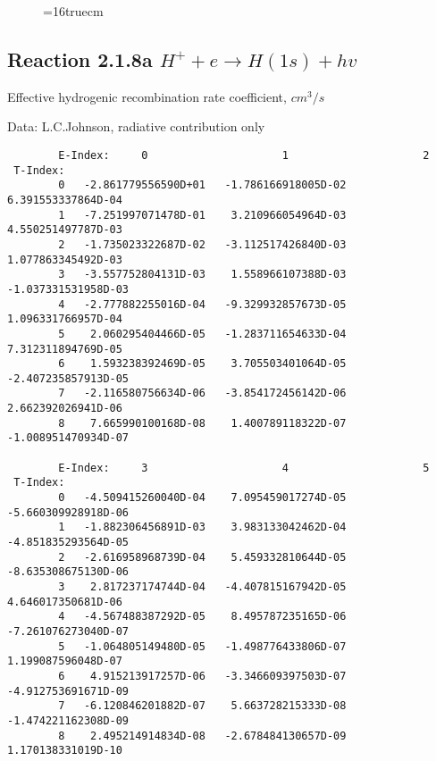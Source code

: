 \documentclass[12pt,dvipdfmx]{article}
\begin{document}
{\begin{small}
\begin{verbatim}
\end{verbatim}\end{small}
\begin{figure} \label{2.1.8FU}
\epsfxsize=16truecm
\end{figure}
\newpage


\subsection{
  Reaction 2.1.8a  $H^+ + e \rightarrow H(1s) + hv $
}

   Effective hydrogenic recombination rate coefficient, $cm^3/s$

   Data: L.C.Johnson, radiative contribution only


\begin{small}\begin{verbatim}
        E-Index:     0                     1                     2
 T-Index:
        0   -2.861779556590D+01   -1.786166918005D-02    6.391553337864D-04
        1   -7.251997071478D-01    3.210966054964D-03    4.550251497787D-03
        2   -1.735023322687D-02   -3.112517426840D-03    1.077863345492D-03
        3   -3.557752804131D-03    1.558966107388D-03   -1.037331531958D-03
        4   -2.777882255016D-04   -9.329932857673D-05    1.096331766957D-04
        5    2.060295404466D-05   -1.283711654633D-04    7.312311894769D-05
        6    1.593238392469D-05    3.705503401064D-05   -2.407235857913D-05
        7   -2.116580756634D-06   -3.854172456142D-06    2.662392026941D-06
        8    7.665990100168D-08    1.400789118322D-07   -1.008951470934D-07

        E-Index:     3                     4                     5
 T-Index:
        0   -4.509415260040D-04    7.095459017274D-05   -5.660309928918D-06
        1   -1.882306456891D-03    3.983133042462D-04   -4.851835293564D-05
        2   -2.616958968739D-04    5.459332810644D-05   -8.635308675130D-06
        3    2.817237174744D-04   -4.407815167942D-05    4.646017350681D-06
        4   -4.567488387292D-05    8.495787235165D-06   -7.261076273040D-07
        5   -1.064805149480D-05   -1.498776433806D-07    1.199087596048D-07
        6    4.915213917257D-06   -3.346609397503D-07   -4.912753691671D-09
        7   -6.120846201882D-07    5.663728215333D-08   -1.474221162308D-09
        8    2.495214914834D-08   -2.678484130657D-09    1.170138331019D-10


\end{verbatim}
\end{small}}
\end{document}
